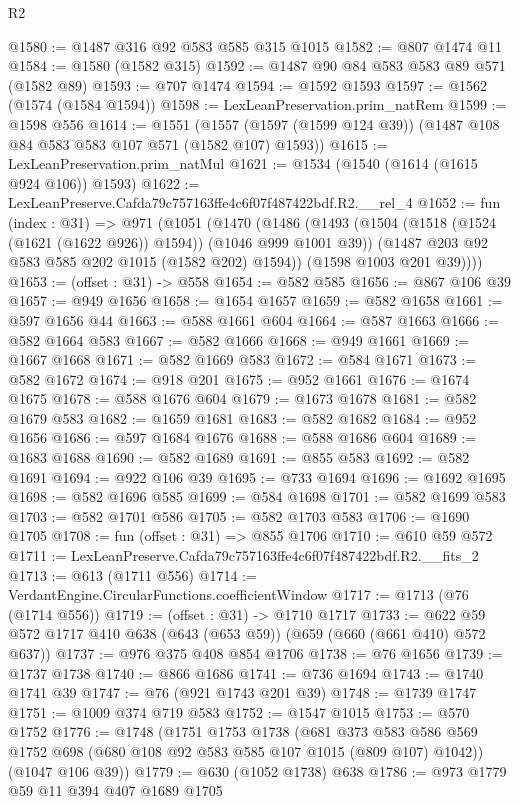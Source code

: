 \begin{lexlean}{R2}
\begin{coremodule}
@1580 := @1487 @316 @92 @583 @585 @315 @1015
@1582 := @807 @1474 @11
@1584 := @1580 (@1582 @315)
@1592 := @1487 @90 @84 @583 @583 @89 @571 (@1582 @89)
@1593 := @707 @1474
@1594 := @1592 @1593
@1597 := @1562 (@1574 (@1584 @1594))
@1598 := LexLeanPreservation.prim_natRem
@1599 := @1598 @556
@1614 := @1551
    (@1557 (@1597 (@1599 @124 @39)) (@1487 @108 @84 @583 @583 @107 @571 (@1582 @107) @1593))
@1615 := LexLeanPreservation.prim_natMul
@1621 := @1534 (@1540 (@1614 (@1615 @924 @106)) @1593)
@1622 := LexLeanPreserve.Cafda79c757163ffe4c6f07f487422bdf.R2.__rel_4
@1652 := fun (index : @31) =>
  @971
    (@1051
      (@1470
        (@1486
          (@1493
            (@1504 (@1518 (@1524 (@1621 (@1622 @926)) @1594)) (@1046 @999 @1001 @39))
            (@1487 @203 @92 @583 @585 @202 @1015 (@1582 @202) @1594))
          (@1598 @1003 @201 @39))))
@1653 := (offset : @31) -> @558
@1654 := @582 @585
@1656 := @867 @106 @39
@1657 := @949 @1656
@1658 := @1654 @1657
@1659 := @582 @1658
@1661 := @597 @1656 @44
@1663 := @588 @1661 @604
@1664 := @587 @1663
@1666 := @582 @1664 @583
@1667 := @582 @1666
@1668 := @949 @1661
@1669 := @1667 @1668
@1671 := @582 @1669 @583
@1672 := @584 @1671
@1673 := @582 @1672
@1674 := @918 @201
@1675 := @952 @1661
@1676 := @1674 @1675
@1678 := @588 @1676 @604
@1679 := @1673 @1678
@1681 := @582 @1679 @583
@1682 := @1659 @1681
@1683 := @582 @1682
@1684 := @952 @1656
@1686 := @597 @1684 @1676
@1688 := @588 @1686 @604
@1689 := @1683 @1688
@1690 := @582 @1689
@1691 := @855 @583
@1692 := @582 @1691
@1694 := @922 @106 @39
@1695 := @733 @1694
@1696 := @1692 @1695
@1698 := @582 @1696 @585
@1699 := @584 @1698
@1701 := @582 @1699 @583
@1703 := @582 @1701 @586
@1705 := @582 @1703 @583
@1706 := @1690 @1705
@1708 := fun (offset : @31) => @855 @1706
@1710 := @610 @59 @572
@1711 := LexLeanPreserve.Cafda79c757163ffe4c6f07f487422bdf.R2.__fits_2
@1713 := @613 (@1711 @556)
@1714 := VerdantEngine.CircularFunctions.coefficientWindow
@1717 := @1713 (@76 (@1714 @556))
@1719 := (offset : @31) -> @1710 @1717
@1733 := @622 @59 @572 @1717 @410 @638 (@643 (@653 @59)) (@659 (@660 (@661 @410) @572 @637))
@1737 := @976 @375 @408 @854 @1706
@1738 := @76 @1656
@1739 := @1737 @1738
@1740 := @866 @1686
@1741 := @736 @1694
@1743 := @1740 @1741 @39
@1747 := @76 (@921 @1743 @201 @39)
@1748 := @1739 @1747
@1751 := @1009 @374 @719 @583
@1752 := @1547 @1015
@1753 := @570 @1752
@1776 := @1748
    (@1751
      @1753
      @1738
      (@681 @373 @583 @586 @569 @1752 @698 (@680 @108 @92 @583 @585 @107 @1015 (@809 @107) @1042))
      (@1047 @106 @39))
@1779 := @630 (@1052 @1738) @638
@1786 := @973 @1779 @59 @11 @394 @407 @1689 @1705

\end{coremodule}
\end{lexlean}
